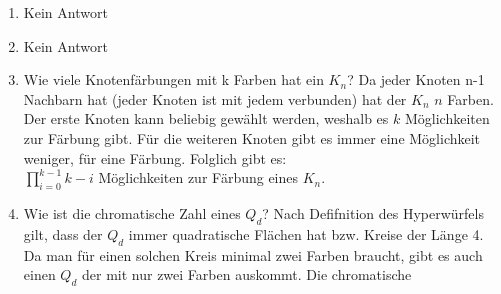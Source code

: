 \begin{enumerate}[label=(\alph*)]
        \item Kein Antwort
        
        \item Kein Antwort

        \item Wie viele Knotenfärbungen mit k Farben hat ein $K_n$?
        Da jeder Knoten n-1 Nachbarn hat (jeder Knoten ist mit jedem verbunden) hat der $K_n$ $n$ Farben. 
        Der erste Knoten kann beliebig gewählt werden, weshalb es $k$ Möglichkeiten zur Färbung gibt. 
        Für die weiteren Knoten gibt es immer eine Möglichkeit weniger, für eine Färbung. Folglich gibt es: \\
        $\prod_{i=0}^{k-1} k - i$ Möglichkeiten zur Färbung eines $K_n$.
          
        \item Wie ist die chromatische Zahl eines $Q_d$?
        Nach Defifnition des Hyperwürfels gilt, dass der $Q_d$ immer quadratische Flächen hat bzw. Kreise der Länge 4. Da man für einen solchen Kreis minimal zwei Farben braucht, gibt es auch einen $Q_d$ der mit nur zwei Farben auskommt. Die chromatische
        
    \end{enumerate}

